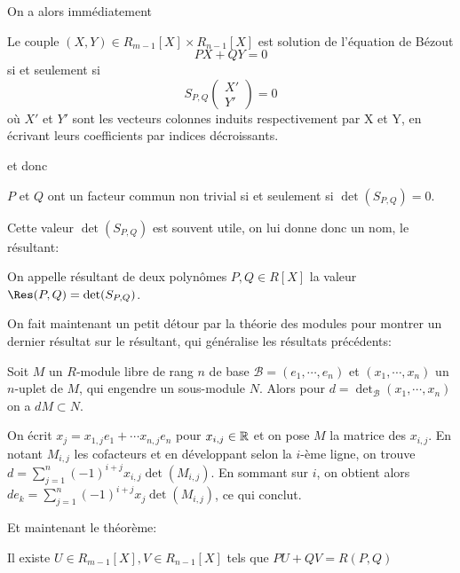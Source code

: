 \documentclass{article}
\begin{document}
On a alors immédiatement

\begin{proposition}
    Le couple $(X, Y) \in R_{m-1}[X] \times R_{n-1}[X]$ est solution de l'équation de Bézout
    $$PX + QY = 0$$
    si et seulement si
    $$S_{P, Q}\begin{pmatrix}X' \\ Y' \end{pmatrix} = 0$$
    où $X'$ et $Y'$ sont les vecteurs colonnes induits respectivement par X et Y, en écrivant leurs coefficients par indices décroissants.
\end{proposition}
et donc

\begin{theoreme}
    $P$ et $Q$ ont un facteur commun non trivial si et seulement si $\det(S_{P, Q}) = 0$.
\end{theoreme}

Cette valeur $\det(S_{P, Q})$ est souvent utile, on lui donne donc un nom, le résultant:

\begin{definition}
    On appelle résultant de deux polynômes $P, Q \in R[X]$ la valeur $\Res(P, Q) = \det(S_{P, Q})$.
\end{definition}

On fait maintenant un petit détour par la théorie des modules pour montrer un dernier résultat sur le résultant, qui généralise les résultats précédents:

\begin{proposition}
    Soit $M$ un $R$-module libre de rang $n$ de base $\mathcal{B} = (e_1, \cdots, e_n)$ et $(x_1, \cdots, x_n)$ un $n$-uplet de $M$, qui engendre un sous-module $N$. Alors pour $d =\det_\mathcal{B}(x_1, \cdots, x_n)$ on a $dM \subset N$.
\end{proposition}

\begin{preuve}
    On écrit $x_j = x_{1, j}e_1 + \cdots x_{n, j}e_n$ pour $x_{i, j} \in \mathbb{R}$ et on pose $M$ la matrice des $x_{i, j}$. En notant $M_{i, j}$ les cofacteurs et en développant selon la $i$-ème ligne, on trouve $d = \sum_{j=1}^{n}{(-1)^{i+j}x_{i,j}\det(M_{i, j})}$. En sommant sur $i$, on obtient alors $de_k = \sum_{j=1}^{n}{(-1)^{i+j}x_j\det(M_{i, j})}$, ce qui conclut.\\
\end{preuve}
Et maintenant le théorème:
\begin{theoreme}
    Il existe $U \in R_{m-1}[X], V \in R_{n-1}[X]$ tels que $PU + QV = R(P, Q)$
\end{theoreme}
\end{document}
